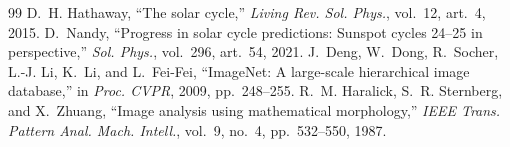 \documentclass[conference]{IEEEtran}
\begin{document}
\begin{thebibliography}{99}
 D.~H. Hathaway, ``The solar cycle,'' \emph{Living Rev. Sol. Phys.}, vol.~12, art.~4, 2015.
 D.~Nandy, ``Progress in solar cycle predictions: Sunspot cycles 24--25 in perspective,'' \emph{Sol. Phys.}, vol.~296, art.~54, 2021.
 J.~Deng, W.~Dong, R.~Socher, L.-J. Li, K.~Li, and L.~Fei-Fei, ``ImageNet: A large-scale hierarchical image database,'' in \emph{Proc. CVPR}, 2009, pp.~248--255.
 R.~M. Haralick, S.~R. Sternberg, and X.~Zhuang, ``Image analysis using mathematical morphology,'' \emph{IEEE Trans. Pattern Anal. Mach. Intell.}, vol.~9, no.~4, pp.~532--550, 1987.
\end{thebibliography}
\end{document}
